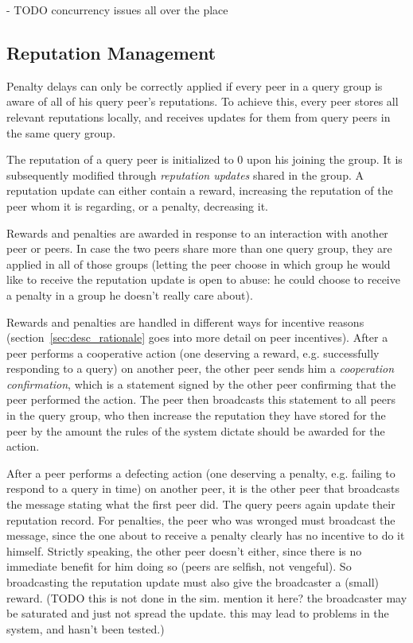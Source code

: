 - TODO concurrency issues all over the place

\subsection{Reputation Management}
\label{sec:desc_rep_management}
Penalty delays can only be correctly applied if every peer in a query group is
aware of all of his query peer's reputations. To achieve this, every peer stores
all relevant reputations locally, and receives updates for them from query peers
in the same query group.

The reputation of a query peer is initialized to 0 upon his joining the group.
It is subsequently modified through \emph{reputation updates} shared in the
group. A reputation update can either contain a reward, increasing the
reputation of the peer whom it is regarding, or a penalty, decreasing it.

Rewards and penalties are awarded in response to an interaction with another
peer or peers. In case the two peers share more than one query group, they are
applied in all of those groups (letting the peer choose in which group he would
like to receive the reputation update is open to abuse: he could choose to
receive a penalty in a group he doesn't really care about).

Rewards and penalties are handled in different ways for incentive reasons
(section~\ref{sec:desc_rationale} goes into more detail on peer incentives).
After a peer performs a cooperative action (one deserving a reward, e.g.
successfully responding to a query) on another peer, the other peer sends him a
\emph{cooperation confirmation}, which is a statement signed by the other peer
confirming that the peer performed the action. The peer then broadcasts this
statement to all peers in the query group, who then increase the reputation they
have stored for the peer by the amount the rules of the system dictate should be
awarded for the action.

After a peer performs a defecting action (one deserving a penalty, e.g. failing
to respond to a query in time) on another peer, it is the other peer that
broadcasts the message stating what the first peer did. The query peers again
update their reputation record. For penalties, the peer who was wronged must
broadcast the message, since the one about to receive a penalty clearly has no
incentive to do it himself. Strictly speaking, the other peer doesn't either,
since there is no immediate benefit for him doing so (peers are selfish, not
vengeful). So broadcasting the reputation update must also give the broadcaster
a (small) reward. (TODO this is not done in the sim. mention it here? the
broadcaster may be saturated and just not spread the update. this may lead to
problems in the system, and hasn't been tested.)

